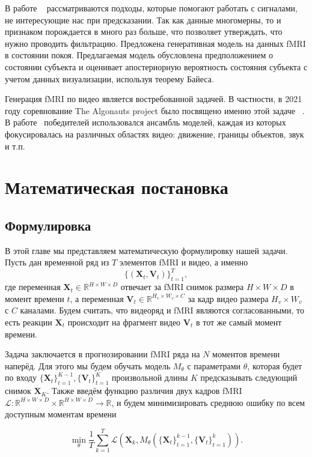 \documentclass{article}
\renewcommand{\vec}[1]{\mathbf{#1}}
\newcommand{\R}[]{\mathbb{R}}
\begin{document}
В работе ~\cite{matsubara2019deep} рассматриваются подходы, которые помогают работать с сигналами, не интересующие нас при предсказании. Так как данные многомерны, то и признаком порождается в много раз больше, что позволяет утверждать, что нужно проводить фильтрацию. Предложена генеративная модель на данных fMRI в состоянии покоя. Предлагаемая модель обусловлена предположением о состоянии субъекта и оценивает апостериорную вероятность состояния субъекта с учетом данных визуализации, используя теорему Байеса.

Генерация fMRI по видео является востребованной задачей. В частности, в 2021 году соревнование The Algonauts project было посвящено именно этой задаче ~\cite{DBLP:journals/corr/abs-2104-13714}. В работе ~\cite{Yang2021.08.24.457581}победителей использовался ансамбль моделей, каждая из которых фокусировалась на различных областях видео: движение, границы объектов, звук и т.п.


\section{Мaтематическая постановка}
\subsection{Формулировка}
В этой главе мы представляем математическую формулировку нашей задачи. Пусть дан временной ряд из $T$ элементов fMRI и видео, а именно
$$\{(\vec{X}_t, \vec{V}_t)\}_{t= 1}^T,$$
где переменная $\vec{X}_t \in \R^{H \times W\times D}$ отвечает за fMRI снимок размера $H \times W\times D$ в момент времени $t$, а переменная $\vec{V}_t \in \R^{H_v \times W_v \times C}$ за кадр видео размера $H_v \times W_v$ с $C$ каналами. Будем считать, что видеоряд и fMRI являются согласованными, то есть реакции $\vec{X}_t$ происходит на фрагмент видео $\vec{V}_t$ в тот же самый момент времени.

 Задача заключается в прогнозировании fMRI ряда на $N$ моментов времени наперёд. Для этого мы будем обучать модель $M_\theta$ с параметрами $\theta$, которая будет по входу $ \{\vec{X}_t\}_{t=1}^{K-1}, \{ \vec{V}_t\}_{t= 1}^{K}$  произвольной длины $K$ предсказывать следующий снимок $\vec{X}_K$. Также введём функцию различия двух кадров fMRI $\mathcal{L}: \R^{H \times W\times D} \times  \R^{H \times W\times D} \rightarrow \R$, и будем минимизировать среднюю ошибку по всем доступным моментам времени 

 \begin{equation}\label{eq:min_task}
     \min\limits_{\theta} \frac1T \sum_{k=1}^T  \mathcal{L}(\vec{X}_k, M_\theta(\{\vec{X}_t\}_{t=1}^{k-1}, \{ \vec{V}_t\}_{t= 1}^{k})).
 \end{equation}
\end{document}
